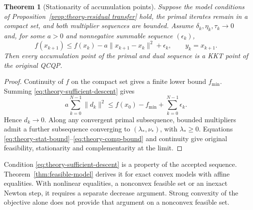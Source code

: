 \documentclass[pdflatex,sn-mathphys-num]{sn-jnl}
\theoremstyle{thmstyleone}
\newtheorem{theorem}{Theorem}[section]
\theoremstyle{thmstylethree}
\begin{document}
\begin{theorem}[Stationarity of accumulation points]
\label{thm:theory-cluster}
Suppose the model conditions of Proposition~\ref{prop:theory-residual transfer}
hold, the primal iterates remain in a compact set, and both multiplier
sequences are bounded. Assume $\delta_k,\eta_k,\tau_k\to0$ and, for some
$a>0$ and nonnegative summable sequence $(\epsilon_k)$,
\begin{equation}
 f(x_{k+1})\leq f(x_k)-a\|x_{k+1}-x_k\|^2+\epsilon_k,
 \qquad y_k=x_{k+1}.
 \label{eq:theory-sufficient-descent}
\end{equation}
Then every accumulation point of the primal and dual sequence is a KKT point
of the original QCQP.
\end{theorem}
\begin{proof}
Continuity of $f$ on the compact set gives a finite lower bound $f_{\min}$.
Summing \eqref{eq:theory-sufficient-descent} gives
\[
 a\sum_{k=0}^{N-1}\|d_k\|^2
 \leq f(x_0)-f_{\min}+\sum_{k=0}^{N-1}\epsilon_k.
\]
Hence $d_k\to0$. Along any convergent primal subsequence, bounded
multipliers admit a further subsequence converging to $(\lambda_*,\nu_*)$,
with $\lambda_*\geq0$. Equations
\eqref{eq:theory-stat-bound}--\eqref{eq:theory-comp-bound} and continuity
give original feasibility, stationarity and complementarity at the limit.
\end{proof}

Condition \eqref{eq:theory-sufficient-descent} is a property of the accepted
sequence. Theorem~\ref{thm:feasible-model} derives it for exact convex
models with affine equalities. With nonlinear equalities, a nonconvex
feasible set or an inexact Newton step, it requires a separate decrease
argument. Strong convexity of the objective alone does not provide that
argument on a nonconvex feasible set.
\end{document}
